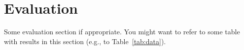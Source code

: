 \section{Evaluation} \label{evaluation}

Some evaluation section if appropriate. You might want to refer to some table with results in this section (e.g., to Table~\ref{tab:data}).


